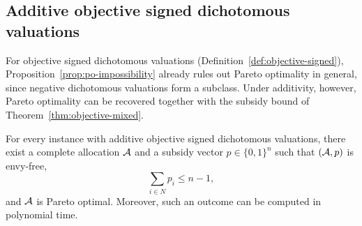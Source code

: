 \subsection{Additive objective signed dichotomous valuations}
\label{sec:pareto-objective}

For objective signed dichotomous valuations (Definition~\ref{def:objective-signed}),
Proposition~\ref{prop:po-impossibility} already rules out Pareto optimality in
general, since negative dichotomous valuations form a subclass. Under additivity,
however, Pareto optimality can be recovered together with the subsidy bound of
Theorem~\ref{thm:objective-mixed}.

\begin{proposition}
\label{prop:additive-objective-po}
For every instance with additive objective signed dichotomous valuations, there
exist a complete allocation $\mathcal{A}$ and a subsidy vector $p\in\{0,1\}^n$ such
that $(\mathcal{A},p)$ is envy-free,
\[
  \sum_{i\in N}p_i\leq n-1,
\]
and $\mathcal{A}$ is Pareto optimal. Moreover, such an outcome can be computed in
polynomial time.
\end{proposition}

